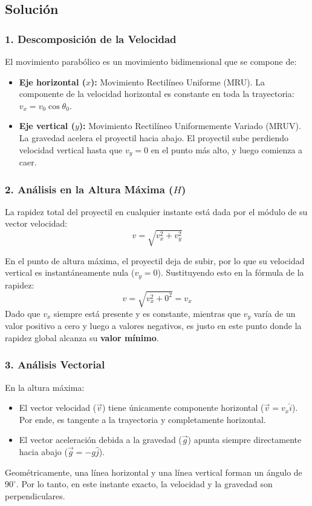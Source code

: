 \documentclass[12pt, a4paper]{article}
\begin{document}
\subsection*{Solución}

\subsubsection*{1. Descomposición de la Velocidad}
El movimiento parabólico es un movimiento bidimensional que se compone de:
\begin{itemize}
    \item \textbf{Eje horizontal ($x$):} Movimiento Rectilíneo Uniforme (MRU). La componente de la velocidad horizontal es constante en toda la trayectoria: $v_x = v_0 \cos \theta_0$.
    \item \textbf{Eje vertical ($y$):} Movimiento Rectilíneo Uniformemente Variado (MRUV). La gravedad acelera el proyectil hacia abajo. El proyectil sube perdiendo velocidad vertical hasta que $v_y = 0$ en el punto más alto, y luego comienza a caer.
\end{itemize}

\subsubsection*{2. Análisis en la Altura Máxima ($H$)}
La rapidez total del proyectil en cualquier instante está dada por el módulo de su vector velocidad:
$$ v = \sqrt{v_x^2 + v_y^2} $$

En el punto de altura máxima, el proyectil deja de subir, por lo que su velocidad vertical es instantáneamente nula ($v_y = 0$). Sustituyendo esto en la fórmula de la rapidez:
$$ v = \sqrt{v_x^2 + 0^2} = v_x $$
Dado que $v_x$ siempre está presente y es constante, mientras que $v_y$ varía de un valor positivo a cero y luego a valores negativos, es justo en este punto donde la rapidez global alcanza su \textbf{valor mínimo}.

\subsubsection*{3. Análisis Vectorial}
En la altura máxima:
\begin{itemize}
    \item El vector velocidad ($\vec{v}$) tiene únicamente componente horizontal ($\vec{v} = v_x \hat{i}$). Por ende, es tangente a la trayectoria y completamente horizontal.
    \item El vector aceleración debida a la gravedad ($\vec{g}$) apunta siempre directamente hacia abajo ($\vec{g} = -g \hat{j}$).
\end{itemize}
Geométricamente, una línea horizontal y una línea vertical forman un ángulo de $90^\circ$. Por lo tanto, en este instante exacto, la velocidad y la gravedad son perpendiculares.
\end{document}

